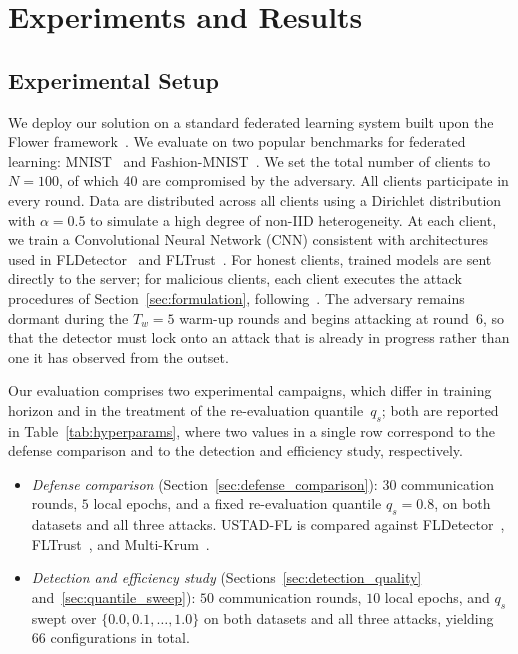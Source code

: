 \documentclass[journal]{IEEEtran}
\begin{document}
\section{Experiments and Results}
\label{sec:experiments}

\subsection{Experimental Setup}

We deploy our solution on a standard federated learning system built upon the Flower framework~\cite{beutel2020flower}. We evaluate on two popular benchmarks for federated learning: MNIST~\cite{lecun1998mnist} and Fashion-MNIST~\cite{xiao2017fashion}. We set the total number of clients to $N = 100$, of which $40$ are compromised by the adversary. All clients participate in every round. Data are distributed across all clients using a Dirichlet distribution with $\alpha = 0.5$ to simulate a high degree of non-IID heterogeneity. At each client, we train a Convolutional Neural Network (CNN) consistent with architectures used in FLDetector~\cite{zhang2022fldetector} and FLTrust~\cite{cao2020fltrust}. For honest clients, trained models are sent directly to the server; for malicious clients, each client executes the attack procedures of Section~\ref{sec:formulation}, following~\cite{baruch2019little, shejwalkar2021manipulating}. The adversary remains dormant during the $T_w = 5$ warm-up rounds and begins attacking at round~$6$, so that the detector must lock onto an attack that is already in progress rather than one it has observed from the outset.

Our evaluation comprises two experimental campaigns, which differ in training horizon and in the treatment of the re-evaluation quantile~$q_s$; both are reported in Table~\ref{tab:hyperparams}, where two values in a single row correspond to the defense comparison and to the detection and efficiency study, respectively.
\begin{itemize}
    \item \emph{Defense comparison} (Section~\ref{sec:defense_comparison}): $30$ communication rounds, $5$ local epochs, and a fixed re-evaluation quantile $q_s = 0.8$, on both datasets and all three attacks. USTAD-FL is compared against FLDetector~\cite{zhang2022fldetector}, FLTrust~\cite{cao2020fltrust}, and Multi-Krum~\cite{blanchard2017machine}.
    \item \emph{Detection and efficiency study} (Sections~\ref{sec:detection_quality} and~\ref{sec:quantile_sweep}): $50$ communication rounds, $10$ local epochs, and $q_s$ swept over $\{0.0, 0.1, \ldots, 1.0\}$ on both datasets and all three attacks, yielding $66$ configurations in total.
\end{itemize}
\end{document}
